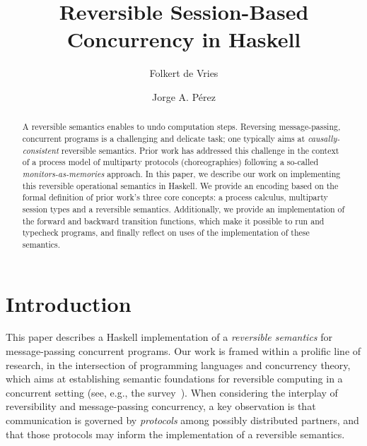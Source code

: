 \documentclass[runningheads,plain]{llncs}
\begin{document}
\title{Reversible Session-Based Concurrency in Haskell}

\author{Folkert de Vries \and
Jorge A. P\'{e}rez%
}
%
%
\maketitle



\begin{abstract}
A reversible semantics enables to undo computation steps. 
Reversing  
message-passing, concurrent programs is a
challenging and delicate task; one typically aims at 
\emph{causally-consistent} reversible semantics.
Prior work has addressed this
challenge in the context of a process model of multiparty protocols
(choreographies) following a so-called \emph{monitors-as-memories}
approach. In this paper, we describe our work on implementing
this reversible operational semantics in Haskell. 
We provide an encoding based on
the formal definition of prior work's three core concepts: a process
calculus, multiparty session types and a reversible semantics.
Additionally, we provide an implementation of the forward and backward
transition functions, which make it possible to run and typecheck
programs, and finally reflect on uses of the implementation of these
semantics. 
\end{abstract}





\section{Introduction}
This paper describes a Haskell implementation of 
a \emph{reversible semantics} for message-passing concurrent programs. 
Our work is framed within a prolific line of research, 
in the intersection of programming languages and concurrency theory,
which aims at  
establishing  semantic foundations for reversible computing in a 
concurrent setting (see, e.g., the survey~\cite{DBLP:journals/eatcs/Lanese14}).
When considering the interplay of reversibility and message-passing concurrency, 
a key observation  is that
 communication is governed by
\emph{protocols} among possibly distributed partners, and that 
 those protocols may inform the implementation of a reversible semantics.
\end{document}
